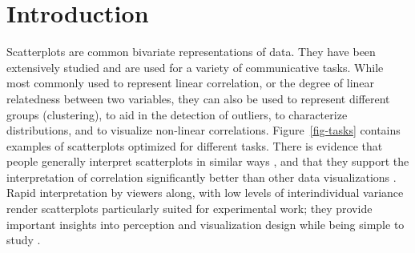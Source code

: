 \documentclass[manuscript, review, anonymous, screen]{acmart}
\begin{document}


\maketitle

\setlength{\parskip}{-0.1pt}

\hypertarget{introduction}{%
\section{Introduction}\label{introduction}}

Scatterplots are common bivariate representations of data. They have
been extensively studied and are used for a variety of communicative
tasks. While most commonly used to represent linear correlation, or the
degree of linear relatedness between two variables, they can also be
used to represent different groups (clustering), to aid in the detection
of outliers, to characterize distributions, and to visualize non-linear
correlations. Figure~\ref{fig-tasks} contains examples of scatterplots
optimized for different tasks. There is evidence that people generally
interpret scatterplots in similar ways \citep{kay_2015}, and that they
support the interpretation of correlation significantly better than
other data visualizations \citep{li_2010}. Rapid interpretation by
viewers \citep{rensink_2014} along, with low levels of interindividual
variance render scatterplots particularly suited for experimental work;
they provide important insights into perception and visualization design
while being simple to study \citep{rensink_2014}.
\end{document}
